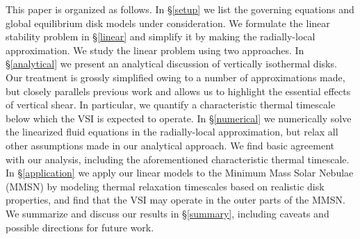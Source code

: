 \documentclass[iop]{emulateapj}
\begin{document}


This paper is organized as follows. In \S\ref{setup} we list the
governing equations and global equilibrium disk models under
consideration. We formulate the linear stability problem in
\S\ref{linear} and simplify it by making the radially-local
approximation. We study the linear problem using two approaches. In
\S\ref{analytical} we present an analytical discussion of vertically
isothermal disks. Our treatment is grossly simplified owing to a
number of approximations made, but closely parallels previous work and 
allows us to highlight the essential effects of vertical shear. In
particular, we quantify a characteristic thermal timescale below which
the VSI is expected to operate. In \S\ref{numerical} we numerically
solve the linearized fluid equations in the radially-local
approximation, but relax all other assumptions made in our analytical approach.   
We find basic agreement with our analysis, including
the aforementioned characteristic thermal timescale. In
\S\ref{application} we apply our linear models to the Minimum Mass
Solar Nebulae (MMSN) by modeling thermal relaxation
timescales based on realistic disk properties, and find that the VSI may
operate in the outer parts of the MMSN. We summarize and discuss our
results in \S\ref{summary}, including caveats and possible directions
for future work.  







 


\appendix




\end{document}

